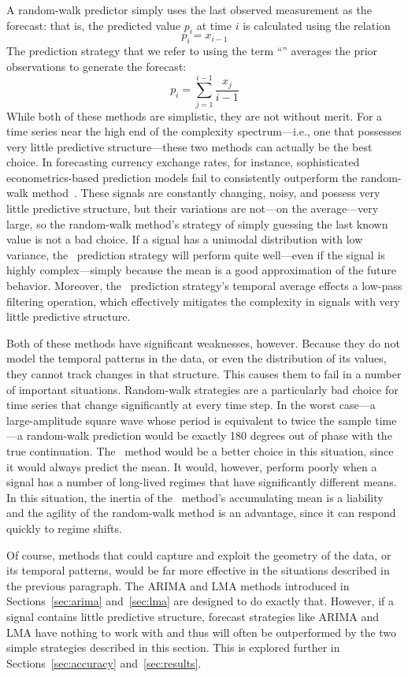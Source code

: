 A random-walk predictor simply uses the last observed measurement as
the forecast: that is, the predicted value $p_i$ at time $i$ is
calculated using the relation $$p_i = x_{i-1}$$ The prediction
strategy that we refer to using the term ``\naive'' averages the prior
observations to generate the forecast: $$p_i =
\sum_{j=1}^{i-1}\frac{x_j}{i-1}$$ While both of these methods are
simplistic, they are not without merit.  For a time series near the
high end of the complexity spectrum---i.e., one that possesses very
little predictive structure---these two methods can actually be the
best choice.  In forecasting currency exchange rates, for instance,
sophisticated econometrics-based prediction models fail to
consistently outperform the random-walk method~\cite{rwMeese,rwCCE}.
These signals are constantly changing, noisy, and possess very little predictive
structure, but their variations are not---on the average---very large, so
the random-walk method's strategy of simply guessing the last known
value is not a bad choice.  If a signal has a unimodal distribution
with low variance, the \naive ~prediction strategy will perform quite
well---even if the signal is highly complex---simply because the mean
is a good approximation of the future behavior.  Moreover, the \naive
~prediction strategy's temporal average effects a low-pass filtering
operation, which effectively mitigates the complexity in signals with
very little predictive structure.

Both of these methods have significant weaknesses, however.  Because
they do not model the temporal patterns in the data, or even the
distribution of its values, they cannot track changes in that
structure.  This causes them to fail in a number of important
situations.  Random-walk strategies are a particularly bad choice for
time series that change significantly at every time step.  In the
worst case---a large-amplitude square wave whose period is equivalent
to twice the sample time---a random-walk prediction would be exactly
180 degrees out of phase with the true continuation.  The \naive
~method would be a better choice in this situation, since it would
always predict the mean.  It would, however, perform poorly when a
signal has a number of long-lived regimes that have significantly
different means.  In this situation, the inertia of the \naive
~method's accumulating mean is a liability and the agility of the
random-walk method is an advantage, since it can respond quickly to
regime shifts.

Of course, methods that could capture and exploit the geometry of the
data, or its temporal patterns, would be far more effective in the
situations described in the previous paragraph.  The ARIMA and LMA
methods introduced in Sections~\ref{sec:arima} and~\ref{sec:lma} are
designed to do exactly that. 
However, if a signal contains little predictive structure, forecast
strategies like ARIMA and LMA have nothing to work with and thus will
often be outperformed by the two simple strategies described in this
section.  This is explored further in Sections~\ref{sec:accuracy}
and~\ref{sec:results}.


